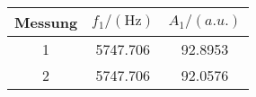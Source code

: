 \label{tab:params}
	\begin{tabular}{S[table-format=1.0]S[table-format=4.3]S[table-format=2.4]}
		\toprule
		{Messung} & {$f_\text{1}/(\si{\hertz})$} & {$A_\text{1}/(\si{a\text{.}u\text{.}})$} \\
		 & 5747.706 & 92.8953 \\
		 2 & 5747.706 & 92.0576 \\
		\bottomrule
	\end{tabular}
